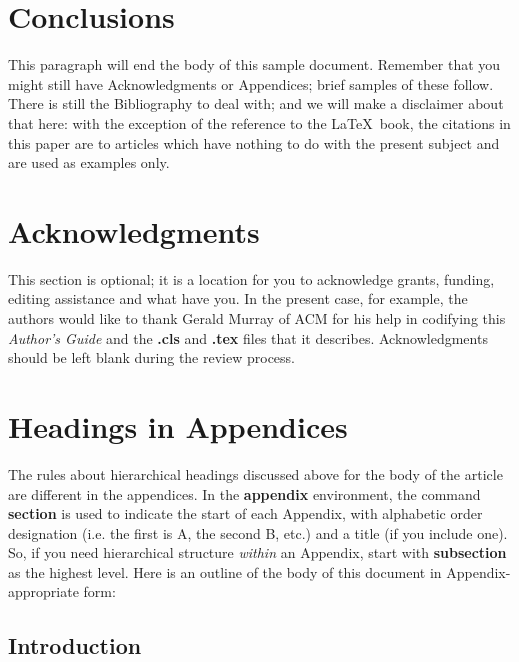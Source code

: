 \documentclass{edm_article}
\begin{document}
\section{Conclusions}
This paragraph will end the body of this sample document.
Remember that you might still have Acknowledgments or
Appendices; brief samples of these
follow.  There is still the Bibliography to deal with; and
we will make a disclaimer about that here: with the exception
of the reference to the \LaTeX\ book, the citations in
this paper are to articles which have nothing to
do with the present subject and are used as
examples only.

\section{Acknowledgments}
This section is optional; it is a location for you
to acknowledge grants, funding, editing assistance and
what have you.  In the present case, for example, the
authors would like to thank Gerald Murray of ACM for
his help in codifying this \textit{Author's Guide}
and the \textbf{.cls} and \textbf{.tex} files that it describes. Acknowledgments should be left blank during the review process.

%

%
\appendix
\section{Headings in Appendices}
The rules about hierarchical headings discussed above for
the body of the article are different in the appendices.
In the \textbf{appendix} environment, the command
\textbf{section} is used to
indicate the start of each Appendix, with alphabetic order
designation (i.e. the first is A, the second B, etc.) and
a title (if you include one).  So, if you need
hierarchical structure
\textit{within} an Appendix, start with \textbf{subsection} as the
highest level. Here is an outline of the body of this
document in Appendix-appropriate form:
\subsection{Introduction}
\end{document}
